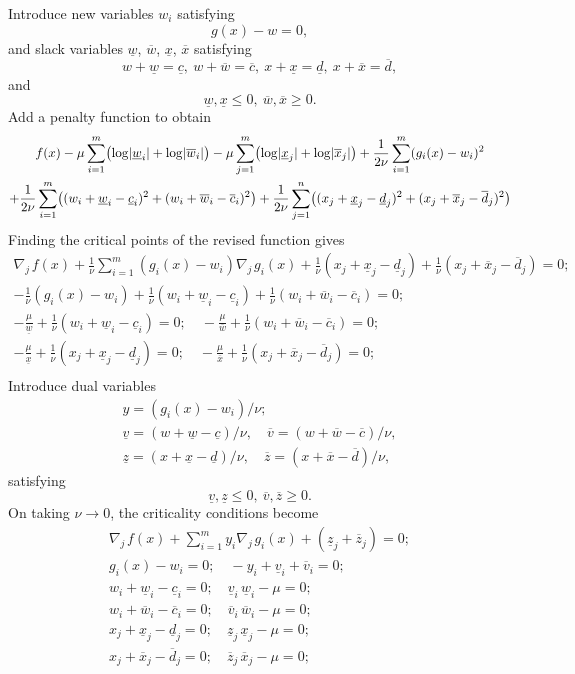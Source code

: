 \documentclass[11pt,a4paper]{article}
\newcommand{\unl}[1]{{\ \!\underline{\;\!\!#1\;\!\!}\ \!}}
\renewcommand{\unl}[1]{{\underline{#1}}}
\newcommand{\ovl}[1]{{\bar{#1}}}
\renewcommand{\ovl}[1]{{\overline{#1}}}
\newcommand{\cl}{{\underline{c}}}
\newcommand{\dl}{{\underline{d}}}
\newcommand{\vl}{{\unl{v}}}
\newcommand{\wl}{{\unl{w}}}
\newcommand{\xl}{{\unl{x}}}
\newcommand{\zl}{{\unl{z}}}
\newcommand{\cu}{{\overline{c}}}
\newcommand{\du}{{\overline{d}}}
\newcommand{\vu}{{\ovl{v}}}
\newcommand{\wu}{{\ovl{w}}}
\newcommand{\xu}{{\ovl{x}}}
\newcommand{\zu}{{\ovl{z}}}
\newcommand{\w}{w}
\newcommand{\x}{x}
\newcommand{\nablaj}{\nabla_{\!j\,}}
\begin{document}
Introduce new variables $w_i$ satisfying
\[ g(\x) - \w = 0 , \]
and slack variables $\wl$, $\wu$, $\xl$, $\xu$ satisfying
\[ \w+\wl=\cl,\ \w+\wu=\cu,\ \x+\xl=\dl,\ \x+\xu=\du,\]
and
\[ \wl,\xl\leq 0,\ \wu,\xu\geq 0 . \]
Add a penalty function to obtain
\begin{multline*} f(x) - \mu \sum_{i=1}^{m}\bigl(\log\!|\wl_i|+\log\!|\wu_i|\bigr) - \mu \sum_{j=1}^{m}\bigl(\log\!|\xl_j|+\log\!|\xu_j|\bigr) + \frac{1}{2\nu} \sum_{i=1}^{m}(g_i(x)-w_i)^2 \\
    \hspace*{\fill} + \frac{1}{2\nu} \sum_{i=1}^{m}\bigl((\w_i+\wl_i-\cl_i)^2+(\w_i+\wu_i-\cu_i)^2\bigr) + \frac{1}{2\nu} \sum_{j=1}^{n}\bigl((\x_j+\xl_j-\dl_j)^2+(\x_j+\xu_j-\du_j)^2\bigr) \end{multline*}
Finding the critical points of the revised function gives
\[ \begin{gathered} 
      \nablaj{f}(x) + \frac{1}{\nu} \sum_{i=1}^{m}(g_i(x)-w_i) \nablaj{g_i}(x) + \frac{1}{\nu}(\x_j+\xl_j-\dl_j)+\frac{1}{\nu}(\x_j+\xu_j-\du_j)= 0; \\
      -\frac{1}{\nu}(g_i(x)-w_i) + \frac{1}{\nu}(\w_i+\wl_i-\cl_i) + \frac{1}{\nu}(\w_i+\wu_i-\cu_i) = 0; \\
      -\frac{\mu}{\wl} + \frac{1}{\nu}(\w_i+\wl_i-\cl_i) = 0; \quad -\frac{\mu}{\wu} + \frac{1}{\nu}(\w_i+\wu_i-\cu_i) = 0; \\
       -\frac{\mu}{\xl} + \frac{1}{\nu}(\x_j+\xl_j-\dl_j) = 0; \quad -\frac{\mu}{\xu} + \frac{1}{\nu}(\x_j+\xu_j-\du_j) = 0; \\
   \end{gathered} \]
Introduce dual variables
\[ \begin{gathered} y = (g_i(x)-w_i)/\nu; \\ \vl=(\w+\wl-\cl)/\nu, \quad \vu=(\w+\wu-\cu)/\nu, \\ \zl=(\x+\xl-\dl)/\nu, \quad \zu=(\x+\xu-\du)/\nu,  \end{gathered} \]
satisfying
\[ \vl,\zl\leq 0,\ \vu,\zu\geq 0 . \]
On taking $\nu\to0$, the criticality conditions become
\[ \begin{gathered} 
      \nablaj{f}(x) + \sum_{i=1}^{m} y_i \nablaj{g_i}(x) + (\zl_j+\zu_j) = 0; \\
      g_i(x) - w_i = 0; \quad -y_i + \vl_i + \vu_i = 0; \\
      \w_i+\wl_i-\cl_i = 0; \quad \vl_i\,\wl_i - \mu = 0; \\
      \w_i+\wu_i-\cu_i = 0; \quad \vu_i\,\wu_i - \mu = 0; \\
      \x_j+\xl_j-\dl_j = 0; \quad \zl_j\,\xl_j - \mu = 0; \\
      \x_j+\xu_j-\du_j = 0; \quad \zu_j\,\xu_j - \mu = 0; 
   \end{gathered} \]
\end{document}
